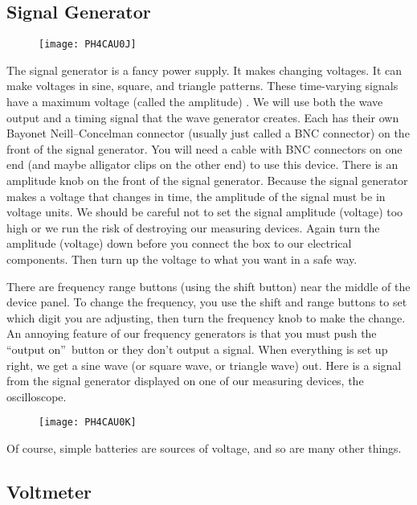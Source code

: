 \subsection{Signal Generator}

\begin{figure}[h!]
	\centering
	\texttt{[image: PH4CAU0J]}
\end{figure}

The signal generator is a fancy
power supply. It makes changing voltages. It can make voltages in sine,
square, and triangle patterns. These time-varying signals have a maximum
voltage (called the amplitude) . We will use both the wave output and a
timing signal that the wave generator creates. Each has their own Bayonet
Neill--Concelman connector (usually just called a BNC connector) on the
front of the signal generator. You will need a cable with BNC connectors on
one end (and maybe alligator clips on the other end) to use this device.
There is an amplitude knob on the front of the signal generator. Because the
signal generator makes a voltage that changes in time, the amplitude of the
signal must be in voltage units. We should be careful not to set the signal
amplitude (voltage) too high or we run the risk of destroying our measuring
devices. Again turn the amplitude (voltage) down before you connect the box
to our electrical components. Then turn up the voltage to what you want in a
safe way.

There are frequency range buttons (using the shift button) near the middle
of the device panel. To change the frequency, you use the shift and range
buttons to set which digit you are adjusting, then turn the frequency knob
to make the change. An annoying feature of our frequency generators is that
you must push the \textquotedblleft output on\textquotedblright\ button or
they don't output a signal. When everything is set up right, we get a sine
wave (or square wave, or triangle wave) out. Here is a signal from the
signal generator displayed on one of our measuring devices, the
oscilloscope. 

\begin{figure}[h!]
    \centering
    \texttt{[image: PH4CAU0K]}
\end{figure}

Of course, simple batteries are sources of voltage, and so are many other
things.

\subsection{Voltmeter}

